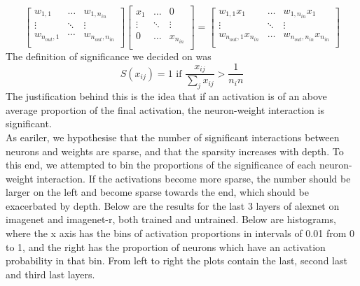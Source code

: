 \documentclass{article}
\begin{document}
        \[
            \begin{bmatrix}
                w_{1,1} & \dots & w_{1,n_{in}} \\
                \vdots & \ddots & \vdots \\
                w_{n_{out}, 1} & \cdots & w_{n_{out}, n_{in}} \\
            \end{bmatrix}
            \begin{bmatrix}
                x_1  & \dots & 0 \\
                \vdots & \ddots & \vdots \\
                0 & \dots & x_{n_{in}} \\
            \end{bmatrix}
            = 
            \begin{bmatrix}
                w_{1,1}x_1  & \dots & w_{1,n_{in}}x_1 \\
                \vdots & \ddots & \vdots \\
                w_{n_{out}, 1}x_{n_{in}} & \dots & w_{n_{out}, n_{in}}x_{n_{in}} \\
            \end{bmatrix}
        \]
    The definition of significance we decided on was 
    \[S(x_{ij}) = 1 \text{ if } \frac{x_{ij}}{\sum_j x_{ij}} > \frac{1}{n_in} \]
    The justification behind this is the idea that if an activation is of an above average proportion of the final activation, the neuron-weight interaction is significant. \\
    As eariler, we hypothesise that the number of significant interactions between neurons and weights are sparse, and that the sparsity increases with depth. To this end, we attempted to bin the proportions of the significance of each neuron-weight interaction. If the activations become more sparse, the number should be larger on the left and become sparse towards the end, which should be exacerbated by depth. Below are the results for the last 3 layers of alexnet on imagenet and imagenet-r, both trained and untrained. Below are histograms, where the x axis has the bins of activation proportions in intervals of 0.01 from 0 to 1, and the right has the proportion of neurons which have an activation probability in that bin. From left to right the plots contain the last, second last and third last layers.
\end{document}
